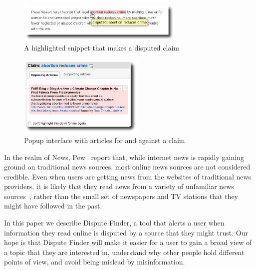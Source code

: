 \documentclass{www2010-submission}
\newcommand{\todo}[1]{}
\begin{document}
\begin{figure}[tb]
	\begin{center}
	\includegraphics[width=8cm]{pictures/highlight_abortion.png}
	\caption{A highlighted snippet that makes a disputed claim}
	\label{highlight}
	\end{center}
\end{figure}

\begin{figure}[tb]
	\begin{center}
	\includegraphics[width=6cm]{pictures/popup_abortion_shadow.png}
	\caption{Popup interface with articles for and against a claim}
	\label{claimview}
	\end{center}
\end{figure}
\todo{Popup interface should contain a "don't mark this" button}

\todo{More screenshots/graphs/visual information}

In the realm of News, Pew~\cite{pew-news} report that, while internet news is rapidly gaining ground on traditional news sources, most online news sources are not considered credible. Even when users are getting news from the websites of traditional news providers, it is likely that they read news from a variety of unfamiliar news sources~\cite{pew-news}, rather than the small set of newspapers and TV stations that they might have followed in the past.

\todo{word this better}\todo{update all screenshots}

In this paper we describe Dispute Finder, a tool that alerts a user when information they read online is disputed by a source that they might trust. Our hope is that Dispute Finder will make it easier for a user to gain a broad view of a topic that they are interested in, understand why other people hold different points of view, and avoid being mislead by misinformation.
\end{document}
